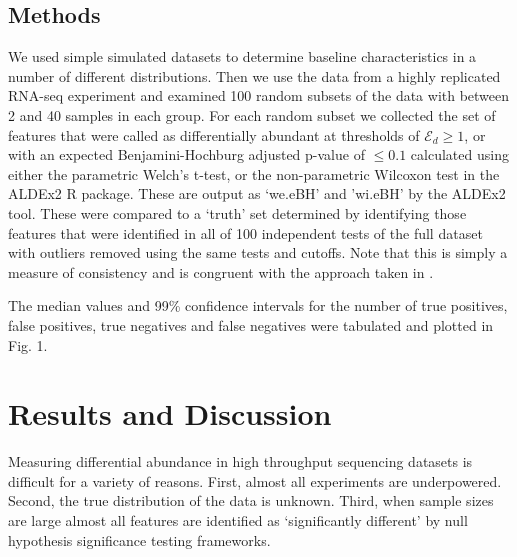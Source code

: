 \documentclass{bioinfo}
\begin{document}
\begin{methods}
\section{Methods}

We used  simple simulated datasets to determine baseline characteristics in a number of different distributions. Then we use the data  from a highly replicated RNA-seq experiment \citep{Schurch:2016aa} and examined 100 random subsets of the data with between 2 and 40 samples in each group. For each random subset we collected the set of features that were called as differentially abundant at thresholds of $\mathcal{E}_{d} \ge 1$, or with an expected Benjamini-Hochburg adjusted p-value of $\le 0.1$ calculated using either the parametric Welch's t-test, or the non-parametric Wilcoxon test in the ALDEx2 R package. These are output as `we.eBH' and 'wi.eBH' by the ALDEx2 tool. These were compared to a `truth' set determined by identifying those features that were identified in all of 100 independent tests of the full dataset with outliers removed using the same tests and cutoffs. Note that this is simply a measure of consistency and is congruent with the approach taken in \citep{Schurch:2016aa}.

The median values and 99\% confidence intervals for the number of true positives, false positives, true negatives and false negatives were tabulated and plotted in Fig. 1.  

\enlargethispage{6pt}

\end{methods}

\section{Results and Discussion}

Measuring differential abundance in high throughput sequencing datasets is difficult for a variety of reasons. First, almost all experiments are underpowered. Second, the true distribution of the data is unknown. Third, when sample sizes are large almost all features are identified as `significantly different' by null hypothesis significance testing frameworks. 
\end{document}
